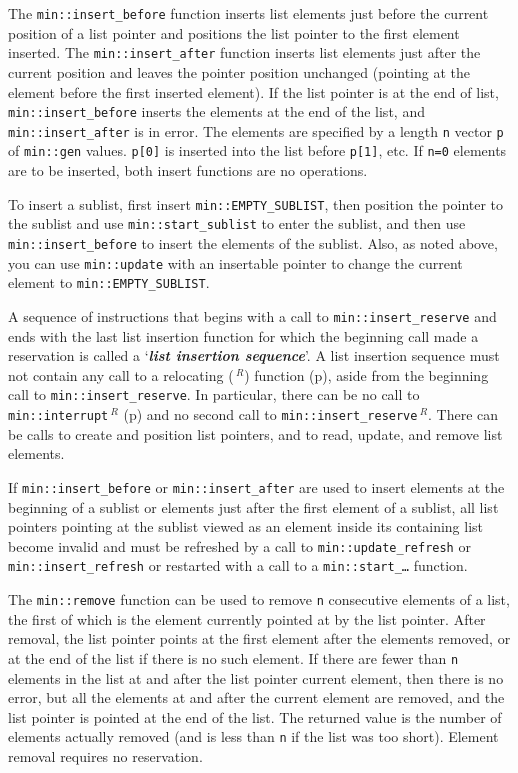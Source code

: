 \documentclass[12pt]{article}
\newcommand{\key}[1]{{\bf \em #1}\index{#1}}
\newcommand{\pagref}[1]{p\pageref{#1}}
\newcommand{\EOL}{\penalty \exhyphenpenalty}
\newcommand{\REL}{$\,^R$}
\begin{document}
The {\tt min::\EOL insert\_before} function inserts list elements
just before the current position of a list pointer and positions the
list pointer to the first element inserted.
The {\tt min::\EOL insert\_after} function inserts list elements just after the
current position and leaves the pointer position unchanged (pointing at
the element before the first inserted element).
If the list pointer is at the end of list,
{\tt min::\EOL insert\_before} inserts the elements at the end of the list, and
{\tt min::\EOL insert\_after} is in error.
The elements are specified by a length {\tt n}
vector {\tt p} of {\tt min::gen} values.
\verb|p[0]| is inserted into the list before \verb|p[1]|, etc.
If \verb|n=0| elements are to be inserted, both insert
functions are no operations.

To insert a sublist, first insert {\tt min::\EOL EMPTY\_SUBLIST}, then
position the pointer to the sublist and use
{\tt min::\EOL start\_sublist} to enter the sublist, and then use
{\tt min::\EOL insert\_before} to insert the elements of the sublist.
Also, as noted above, you can use {\tt min::\EOL update} with an
insertable pointer to change
the current element to {\tt min::\EOL EMPTY\_\EOL SUBLIST}.

A sequence of instructions that begins with a
call to {\tt min::\EOL insert\_reserve} and ends with the last
list insertion function for which the beginning call made a reservation
is called a `\key{list insertion sequence}'.  A list insertion sequence
must not contain any call to
a relocating (\REL) function (\pagref{RELOCATING-FUNCTIONS}), aside from
the beginning call to {\tt min::\EOL insert\_reserve}.  In particular, there can
be no call to {\tt min::\EOL interrupt\REL} (\pagref{MIN::INTERRUPT}) and no
second call to {\tt min::\EOL insert\_reserve\REL}.  There can be calls to
create and position list pointers, and to read, update, and remove
list elements.

If {\tt min::\EOL insert\_\EOL before}
or {\tt min::\EOL insert\_\EOL after}
are used to insert elements at the beginning of a sublist or elements
just after the first element of a sublist,
all list pointers pointing at the sublist viewed as an element
inside its containing list
become invalid and must be refreshed by
a call to {\tt min::\EOL update\_\EOL refresh} or
{\tt min::\EOL insert\_\EOL refresh} or restarted with a call to a
{\tt min::\EOL start\_\ldots} function.

The {\tt min::\EOL remove} function can be used to remove
{\tt n} consecutive elements
of a list, the first of which is the element currently pointed at by
the list pointer.
After removal, the list pointer points at the first element after the
elements removed, or at the end of the list if there is no such element.
If there are fewer than {\tt n} elements in the list at and after
the list pointer current element, then there is no error, but all the
elements at and after the current element are removed, and the list
pointer is pointed at the end of the list.  The returned value is the
number of elements actually removed (and is less than {\tt n} if the
list was too short).  Element removal requires no reservation.
\end{document}
